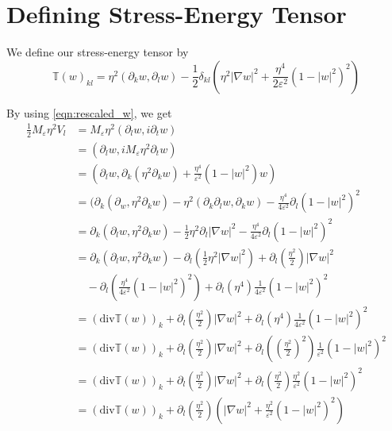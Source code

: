 \documentclass[a4paper]{article}
\renewcommand{\div}{\mathrm{div}}
\begin{document}
\section{Defining Stress-Energy Tensor}
We define our stress-energy tensor by
\begin{equation}
  \mathbb{T}(w)_{kl} = \eta^2 (\partial_k w, \partial_l w) -\frac{1}{2} \delta_{kl} \left( \eta^2 |\nabla w|^2 + \frac{\eta^4}{2 \varepsilon^2}
  (1-|w|^2)^2 \right)
  \label{eqn:stress_energy_tensor}
\end{equation}

By using \eqref{eqn:rescaled_w}, we get
\begin{align}
  \frac{1}{2} M_\varepsilon \eta^2 V_l &= M_\varepsilon \eta^2 (\partial_l w, i \partial_t w) \nonumber \\
  &= (\partial_l w, i M_\varepsilon \eta^2 \partial_t w) \nonumber \\
  &= ( \partial_l w, \partial_k (\eta^2 \partial_k w) + \frac{\eta^4}{\varepsilon^2} (1-|w|^2)w ) \nonumber \\
  &= (\partial_k (\partial_w, \eta^2 \partial_k w) - \eta^2 ( \partial_k \partial_l w, \partial_k w) - \frac{\eta^4}{4 \varepsilon^2} \partial_l
  (1-|w|^2)^2 \nonumber \\
  &= \partial_k (\partial_l w, \eta^2 \partial_k w) - \frac{1}{2} \eta^2 \partial_l | \nabla w |^2 - \frac{\eta^4}{4 \varepsilon^2} \partial_l
  (1-|w|^2)^2 \nonumber \\
  &= \partial_k ( \partial_l w, \eta^2 \partial_k w) - \partial_l (\frac{1}{2} \eta^2 | \nabla w |^2) + \partial_l \left( \frac{\eta^2}{2} \right) |
  \nabla w |^2 \nonumber \\
  &\quad - \partial_l \left( \frac{\eta^4}{4 \varepsilon^2} (1-|w|^2)^2 \right) + \partial_l (\eta^4) \frac{1}{4 \varepsilon^2} (1-|w|^2)^2 \nonumber
  \\
  &= (\div \mathbb{T}(w))_k + \partial_l \left( \frac{\eta^2}{2} \right) | \nabla w |^2 + \partial_l (\eta^4) \frac{1}{4\varepsilon^2} (1-|w|^2)^2
  \nonumber \\
  &= ( \div \mathbb{T}(w) )_k + \partial_l \left( \frac{\eta^2}{2} \right) | \nabla w |^2 + \partial_l \left( \left( \frac{\eta^2}{2} \right)^2
  \right) \frac{1}{\varepsilon^2} (1-|w|^2)^2 \nonumber \\
  &= ( \div \mathbb{T}(w) )_k + \partial_l \left( \frac{\eta^2}{2} \right) | \nabla w |^2 + \partial_l \left( \frac{\eta^2}{2} \right)
  \frac{\eta^2}{\varepsilon^2} (1-|w|^2)^2 \nonumber \\
  &= ( \div \mathbb{T}(w) )_k + \partial_l \left( \frac{\eta^2}{2} \right) \left( | \nabla w |^2 + \frac{\eta^2}{\varepsilon^2} (1-|w|^2)^2 \right)
  \label{eqn:vel_1}
\end{align}
\end{document}
